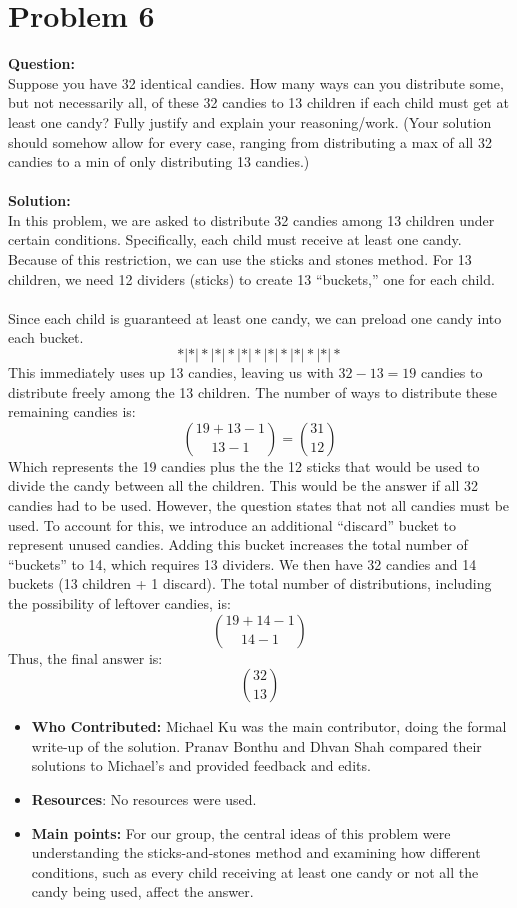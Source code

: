 \documentclass{article}
\begin{document}
\section*{Problem 6}
\textbf{Question:}\\ Suppose you have 32 identical candies. How many ways can you distribute some, but not necessarily all, of these 32 candies to 13  children if each child must get at least one candy? Fully justify and explain your reasoning/work. (Your solution should somehow allow for every case, ranging from distributing a max of all 32 candies to a min of only distributing 13 candies.)\\\\
\textbf{Solution:}\\In this problem, we are asked to distribute 32 candies among 13 children under certain conditions. Specifically, each child must receive at least one candy. Because of this restriction, we can use the sticks and stones method. For 13 children, we need 12 dividers (sticks) to create 13 “buckets,” one for each child. \\\\
Since each child is guaranteed at least one candy, we can preload one candy into each bucket.
\[*|*|*|*|*|*|*|*|*|*|*|*|*\]
This immediately uses up 13 candies, leaving us with $32-13=19$ candies to distribute freely among the 13 children. The number of ways to distribute these remaining candies is:
\[\binom{19+13-1}{13-1} = \binom{31}{12}\]
Which represents the 19 candies plus the the 12 sticks that would be used to divide the candy between all the children. This would be the answer if all 32 candies had to be used. However, the question states that not all candies must be used. To account for this, we introduce an additional “discard” bucket to represent unused candies. Adding this bucket increases the total number of “buckets” to 14, which requires 13 dividers. We then have 32 candies and 14 buckets (13 children + 1 discard). The total number of distributions, including the possibility of leftover candies, is:\\
\[\binom{19+14-1}{14-1}\]
Thus, the final answer is:
\[\binom{32}{13}\]
\begin{itemize}

    \item \textbf{Who Contributed:} Michael Ku was the main contributor, doing the formal write-up of the solution. Pranav Bonthu and Dhvan Shah compared their solutions to Michael's and provided feedback and edits.
    \item \textbf{Resources}: No resources were used.
    \item \textbf{Main points:}  For our group, the central ideas of this problem were understanding the sticks-and-stones method and examining how different conditions, such as every child receiving at least one candy or not all the candy being used, affect the answer.
\end{itemize}
\end{document}

